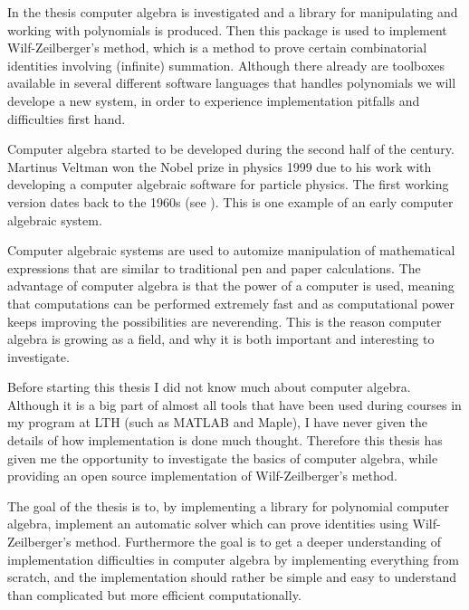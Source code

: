 In the thesis computer algebra is investigated and a library for manipulating and working with polynomials is produced. Then this package is used to implement Wilf-Zeilberger's method, which is a method to prove certain combinatorial identities involving (infinite) summation. Although there already are toolboxes available in several different software languages that handles polynomials we will develope a new system, in order to experience implementation pitfalls and difficulties first hand.

Computer algebra started to be developed during the second half of the  century. Martinus Veltman won the Nobel prize in physics 1999 due to his work with developing a computer algebraic software for particle physics. The first working version dates back to the 1960s (see ). This is one example of an early computer algebraic system.

Computer algebraic systems are used to automize manipulation of mathematical expressions that are similar to traditional pen and paper calculations. The advantage of computer algebra is that the power of a computer is used, meaning that computations can be performed extremely fast and as computational power keeps improving the possibilities are neverending. This is the reason computer algebra is growing as a field, and why it is both important and interesting to investigate.

Before starting this thesis I did not know much about computer algebra. Although it is a big part of almost all tools that have been used during courses in my program at LTH (such as MATLAB and Maple), I have never given the details of how implementation is done much thought. Therefore this thesis has given me the opportunity to investigate the basics of computer algebra, while providing an open source implementation of Wilf-Zeilberger's method.

The goal of the thesis is to, by implementing a library for polynomial computer algebra, implement an automatic solver which can prove identities using Wilf-Zeilberger's method. Furthermore the goal is to get a deeper understanding of implementation difficulties in computer algebra by implementing everything from scratch, and the implementation should rather be simple and easy to understand than complicated but more efficient computationally.
